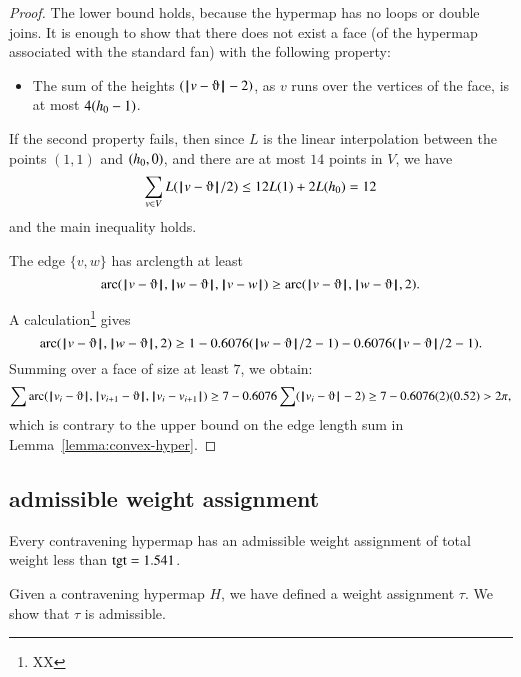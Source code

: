 \begin{proof} The lower bound holds, because the hypermap has no loops or double joins.  It is enough to show that there does not exist a face (of the hypermap associated with the standard fan)
with the following property:
\begin{itemize}
\item The sum of the heights $(\norm{v}{\orgn}-2)$, as $v$ runs
over the vertices of the face, is at most $4({h_0}-1)$.
\end{itemize}
If the second property fails,
then since $L$ is the linear interpolation between
the points $(1,1)$ and $({h_0},0)$, and there are at most
$14$ points in $V$, we have
$$\sum_{v\in V}L(\norm{v}{\orgn}/2) \le 12 L(1) + 2 L(\hm) =12$$
and the main inequality holds.

The edge $\{v,w\}$ has arclength at least
$$
\arc(\norm{v}{\orgn},\norm{w}{\orgn},\norm{v}{w}) \ge \arc(\norm{v}{\orgn},\norm{w}{\orgn},2). 
$$

A calculation\footnote{XX} gives
$$
\arc(\norm{v}{\orgn},\norm{w}{\orgn},2)\ge 1 - 0.6076 (\norm{w}{\orgn}/2 - 1) - 0.6076 (\norm{v}{\orgn}/2 - 1).
$$
Summing over a face of size at least $7$, we obtain:
$$
\sum \arc(\norm{v_i}{\orgn},\norm{v_{i+1}}{\orgn},\norm{v_i}{v_{i+1}})\ge
7 - 0.6076 \sum (\norm{v_i}{\orgn}-2) \ge 7 - 0.6076 (2) (0.52) > 2\pi,
$$
which is contrary to the upper bound on the edge length
sum in Lemma~\ref{lemma:convex-hyper}.
\end{proof}







\subsection{admissible weight assignment}
    \label{sec:weight}


\begin{theorem}  Every contravening hypermap has an admissible
weight assignment of total weight less than ${\operatorname{tgt}}=1.541$.
\end{theorem}

Given a contravening hypermap $H$, we
have defined a weight assignment $\tau$.
We show that $\tau$ is admissible.

\label{sec:admissibility}






